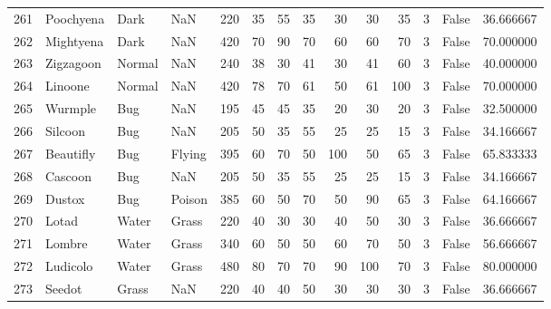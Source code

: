 \begin{tabular}{rlllrrrrrrrrlr}
 261 &                  Poochyena &      Dark &       NaN &    220 &   35 &      55 &       35 &       30 &       30 &     35 &           3 &      False &   36.666667 \\
 262 &                  Mightyena &      Dark &       NaN &    420 &   70 &      90 &       70 &       60 &       60 &     70 &           3 &      False &   70.000000 \\
 263 &                  Zigzagoon &    Normal &       NaN &    240 &   38 &      30 &       41 &       30 &       41 &     60 &           3 &      False &   40.000000 \\
 264 &                    Linoone &    Normal &       NaN &    420 &   78 &      70 &       61 &       50 &       61 &    100 &           3 &      False &   70.000000 \\
 265 &                    Wurmple &       Bug &       NaN &    195 &   45 &      45 &       35 &       20 &       30 &     20 &           3 &      False &   32.500000 \\
 266 &                    Silcoon &       Bug &       NaN &    205 &   50 &      35 &       55 &       25 &       25 &     15 &           3 &      False &   34.166667 \\
 267 &                  Beautifly &       Bug &    Flying &    395 &   60 &      70 &       50 &      100 &       50 &     65 &           3 &      False &   65.833333 \\
 268 &                    Cascoon &       Bug &       NaN &    205 &   50 &      35 &       55 &       25 &       25 &     15 &           3 &      False &   34.166667 \\
 269 &                     Dustox &       Bug &    Poison &    385 &   60 &      50 &       70 &       50 &       90 &     65 &           3 &      False &   64.166667 \\
 270 &                      Lotad &     Water &     Grass &    220 &   40 &      30 &       30 &       40 &       50 &     30 &           3 &      False &   36.666667 \\
 271 &                     Lombre &     Water &     Grass &    340 &   60 &      50 &       50 &       60 &       70 &     50 &           3 &      False &   56.666667 \\
 272 &                   Ludicolo &     Water &     Grass &    480 &   80 &      70 &       70 &       90 &      100 &     70 &           3 &      False &   80.000000 \\
 273 &                     Seedot &     Grass &       NaN &    220 &   40 &      40 &       50 &       30 &       30 &     30 &           3 &      False &   36.666667 \\

\end{tabular}
